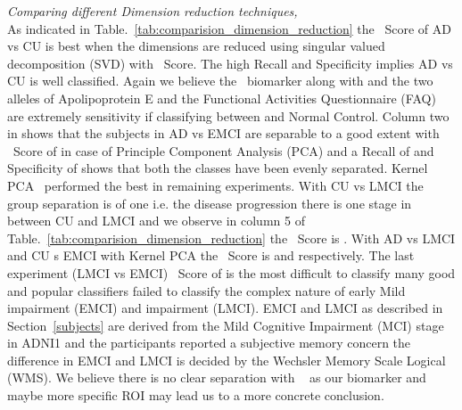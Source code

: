 \textit{Comparing different Dimension reduction techniques,}\\
As indicated in Table.~\ref{tab:comparision_dimension_reduction} the \F~Score of AD vs CU is best when the dimensions are reduced using singular valued decomposition (SVD) with  \F~Score. The high Recall and Specificity implies AD vs CU is well classified. Again we believe the \FDGPET~biomarker along with  and  the two alleles of Apolipoprotein E and the Functional Activities Questionnaire (FAQ) are extremely sensitivity if classifying between \Alzheimers and Normal Control. 
Column two in  shows that the subjects in AD vs EMCI are separable to a good extent with \F~Score of  in case of Principle Component Analysis (PCA) and a Recall of  and Specificity of  shows that both the classes have been evenly separated. 
Kernel PCA~\citep{mika1998kernel} performed the best in remaining experiments. With CU vs LMCI the group separation is of one i.e. the disease progression there is one stage in between CU and LMCI and we observe in column 5 of Table.~\ref{tab:comparision_dimension_reduction} the \F~Score is . With AD vs LMCI and CU s EMCI with Kernel PCA the \F~Score is  and  respectively. The last experiment (LMCI vs EMCI) \F~Score of  is the most difficult to classify many good and popular classifiers failed to classify the complex nature of early Mild impairment (EMCI) and impairment (LMCI). EMCI and LMCI as described in Section~\ref{subjects} are derived from the Mild Cognitive Impairment (MCI) stage in ADNI1 and the participants reported a subjective memory concern the difference in EMCI and LMCI is decided by the Wechsler Memory Scale Logical (WMS). We believe there is no clear separation with \FDGPET~ as our biomarker and maybe more specific ROI may lead us to a more concrete conclusion. 

